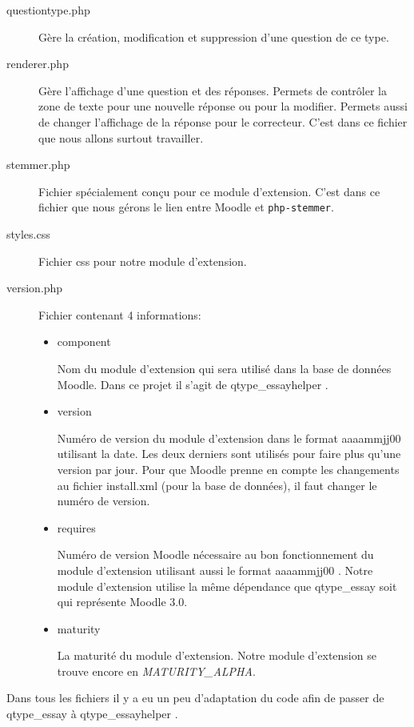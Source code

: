 \begin{description}
 \item[questiontype.php]
 
 G\`ere la cr\'eation, modification et suppression d'une question de ce type.
 
 \item[renderer.php]
 
 G\`ere l'affichage d'une question et des r\'eponses.
 Permets de contr\^oler la zone de texte pour une nouvelle r\'eponse ou pour la modifier.
 Permets aussi de changer l'affichage de la r\'eponse pour le correcteur.
 C'est dans ce fichier que nous allons surtout travailler.
 
 \item[stemmer.php]
 
 Fichier sp\'ecialement con\c{c}u pour ce module d'extension.
 C'est dans ce fichier que nous g\'erons le lien entre Moodle et \texttt{php-stemmer}.
 
 \item[styles.css]
 
 Fichier css pour notre module d'extension.
 
 \item[version.php]
 
 Fichier contenant 4 informations:
 \begin{itemize}
   \item \og component \fg{}
   
   Nom du module d'extension qui sera utilis\'e dans la base de donn\'ees Moodle.
   Dans ce projet il s'agit de \og qtype\_essayhelper \fg{}.
   
   \item \og version \fg{}
   
   Num\'ero de version du module d'extension dans le format \og aaaammjj00 \fg{} utilisant la date.
   Les deux derniers  \fg{} sont utilis\'es pour faire plus qu'une version par jour.
   Pour que Moodle prenne en compte les changements au fichier \og install.xml \fg{} (pour la base de donn\'ees), il faut changer le num\'ero de version.
   
   \item \og requires \fg{}
   
   Num\'ero de version Moodle n\'ecessaire au bon fonctionnement du module d'extension utilisant aussi le format \og aaaammjj00 \fg{}.
   Notre module d'extension utilise la m\^eme d\'ependance que \og qtype\_essay \fg{} soit  \fg{} qui repr\'esente Moodle 3.0.
   
   \item \og maturity \fg{}
   
   La maturit\'e du module d'extension.
   Notre module d'extension se trouve encore en \textit{MATURITY\_ALPHA}.
 \end{itemize}
\end{description}
Dans tous les fichiers il y a eu un peu d'adaptation du code afin de passer de \og qtype\_essay \fg{} \`a \og qtype\_essayhelper \fg{}.
